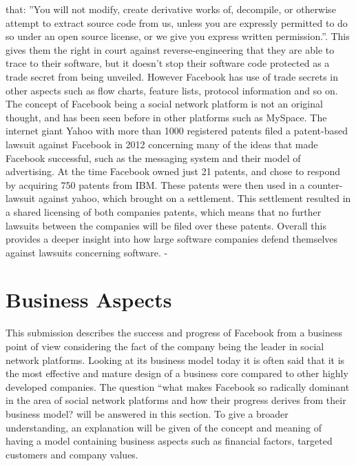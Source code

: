 \documentclass[conference]{IEEEtran}
\begin{document}
that: ”You will not modify, create derivative works of, decompile, or otherwise attempt to extract source code from us, unless you are expressly permitted to do so under an open source license, or we give you express written permission.”\cite{facebookrights2013}. This gives them the right in court against reverse-engineering that they are able to trace to their software, but it doesn’t stop their software code protected as a trade secret from being unveiled. However Facebook has use of trade secrets in other aspects such as flow charts, feature lists, protocol information and so on\cite{nguyen2012}.
The concept of Facebook being a social network platform is not an original thought, and has been seen before in other platforms such as MySpace. The internet giant Yahoo with more than 1000\cite{yahoopatent} registered patents filed a patent-based lawsuit against Facebook in 2012\cite{timothy2012} concerning many of the ideas that made Facebook successful, such as the messaging system and their model of advertising. At the time Facebook owned just 21 patents, and chose to respond by acquiring 750 patents from IBM\cite{forbes2012}. These patents were then used in a counter-lawsuit against yahoo, which brought on a settlement. This settlement resulted in a shared licensing of both companies patents, which means that no further lawsuits between the companies will be filed over these patents. Overall this provides a deeper insight into how large software companies defend themselves against lawsuits concerning software.
-
\section{Business Aspects}
\label{financial}

This submission describes the success and progress of Facebook from a business point of view considering the fact of the company being the leader in social network platforms. Looking at its business model today it is often said that it is the most effective and mature design of a business core compared to other highly developed companies. The question “what makes Facebook so radically dominant in the area of social network platforms and how their progress derives from their business model? will be answered in this section. To give a broader understanding, an explanation will be given of the concept and meaning of having a model containing business aspects such as financial factors, targeted customers and company values.
\end{document}
